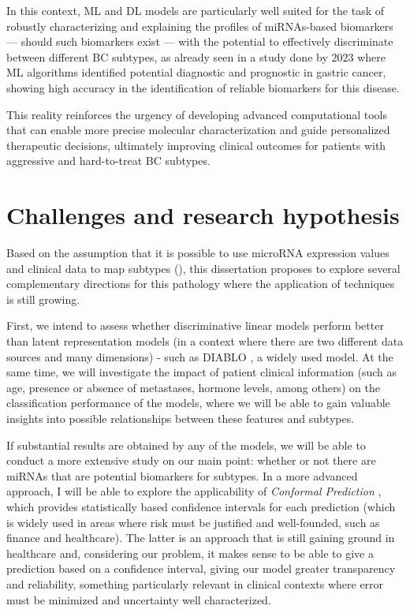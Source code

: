 In this context, \gls{ML} and \gls{DL} models are particularly well suited for
the task of robustly characterizing and explaining the profiles of
\gls{miRNAs}-based biomarkers — should such biomarkers exist — with the
potential to effectively discriminate between different \gls{BC} subtypes, as
already seen in a study done by \textcite{ml_gastric_Azari2023} 2023 where
\gls{ML} algorithms identified potential diagnostic and prognostic
 in gastric cancer, showing high accuracy in the
identification of reliable biomarkers for this disease.

This reality reinforces the urgency of developing advanced computational tools
that can enable more precise molecular characterization and guide personalized
therapeutic decisions, ultimately improving clinical outcomes for patients with
aggressive and hard-to-treat \gls{BC} subtypes.

\section{Challenges and research hypothesis}
\label{sec:challenges+research-hypothesis}
Based on the assumption that it is possible to use microRNA expression values
and clinical data to map  subtypes
(\textcites{mirna_as_biomarkers_Ho2022}{mirnas_in_bc_Muñoz2023}), this dissertation
proposes to explore several complementary directions for this pathology where
the application of  techniques is still growing.

First, we intend to assess whether discriminative linear models perform better
than latent representation models (in a context where there are two different
data sources and many dimensions) - such as DIABLO \textcite{DIABLO_Singh2019},
a widely used model. At the same time, we will investigate the impact of
patient clinical information (such as age, presence or absence of metastases,
hormone levels, among others) on the classification performance of the models,
where we will be able to gain valuable insights into possible relationships
between these features and  subtypes.

If substantial results are obtained by any of the models, we will be able to
conduct a more extensive study on our main point: whether or not there are
\gls{miRNAs} that are potential biomarkers for  subtypes. In a
more advanced approach, I will be able to explore the applicability of
\textit{Conformal Prediction} \textcite{conformal_prediction_Angelopoulos2023},
which provides statistically based confidence intervals for each prediction
(which is widely used in areas where risk must be justified and well-founded,
such as finance and healthcare). The latter is an approach that is still
gaining ground in healthcare and, considering our problem, it makes sense to be
able to give a prediction based on a confidence interval, giving our model
greater transparency and reliability, something particularly relevant in
clinical contexts where error must be minimized and uncertainty well
characterized.

